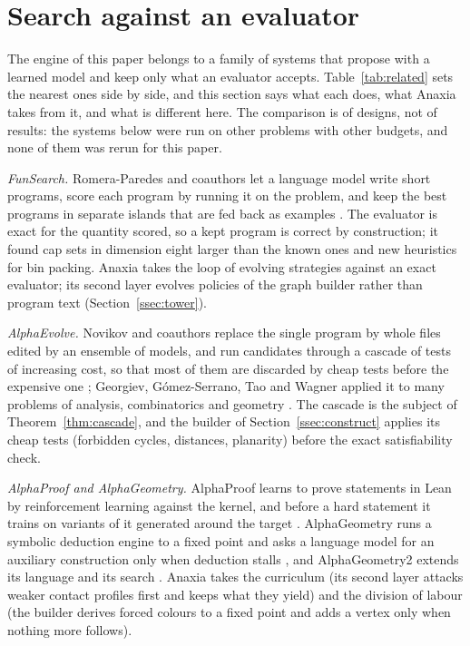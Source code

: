 \section{Search against an evaluator}\label{sec:related}

The engine of this paper belongs to a family of systems that propose with a learned model and keep only what an evaluator accepts. Table~\ref{tab:related} sets the nearest ones side by side, and this section says what each does, what Anaxia takes from it, and what is different here. The comparison is of designs, not of results: the systems below were run on other problems with other budgets, and none of them was rerun for this paper.

\emph{FunSearch.} Romera-Paredes and coauthors let a language model write short programs, score each program by running it on the problem, and keep the best programs in separate islands that are fed back as examples \cite{RBN24}. The evaluator is exact for the quantity scored, so a kept program is correct by construction; it found cap sets in dimension eight larger than the known ones and new heuristics for bin packing. Anaxia takes the loop of evolving strategies against an exact evaluator; its second layer evolves policies of the graph builder rather than program text (Section~\ref{ssec:tower}).

\emph{AlphaEvolve.} Novikov and coauthors replace the single program by whole files edited by an ensemble of models, and run candidates through a cascade of tests of increasing cost, so that most of them are discarded by cheap tests before the expensive one \cite{NVE25}; Georgiev, G\'omez-Serrano, Tao and Wagner applied it to many problems of analysis, combinatorics and geometry \cite{GGT25}. The cascade is the subject of Theorem~\ref{thm:cascade}, and the builder of Section~\ref{ssec:construct} applies its cheap tests (forbidden cycles, distances, planarity) before the exact satisfiability check.

\emph{AlphaProof and AlphaGeometry.} AlphaProof learns to prove statements in Lean by reinforcement learning against the kernel, and before a hard statement it trains on variants of it generated around the target \cite{HMS25}. AlphaGeometry runs a symbolic deduction engine to a fixed point and asks a language model for an auxiliary construction only when deduction stalls \cite{TWL24}, and AlphaGeometry2 extends its language and its search \cite{CTO25}. Anaxia takes the curriculum (its second layer attacks weaker contact profiles first and keeps what they yield) and the division of labour (the builder derives forced colours to a fixed point and adds a vertex only when nothing more follows).

